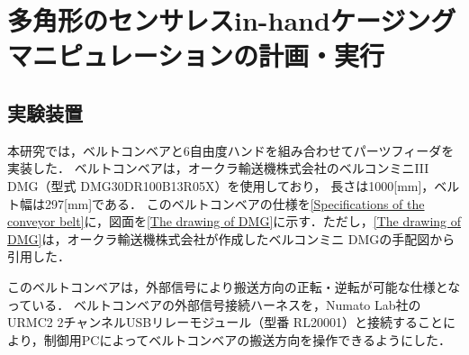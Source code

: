 \documentclass[a4paper,twoside,12pt,papersize, dvipdfmx]{iirthesis}
\begin{document}
    \newcommand{\figref}[1]{\figurename\ref{#1}}
    \newcommand{\tabref}[1]{\tablename\ref{#1}}
    \renewcommand{\eqref}[1]{式~(\ref{#1})}
    \newcommand{\chapref}[1]{\ref{#1}章}
    \newcommand{\secref}[1]{\ref{#1}節}
    \newcommand{\ssecref}[1]{\ref{#1}項}
    \newcommand{\appref}[1]{付録\ref{#1}}
\fi


\chapter{多角形のセンサレスin-handケージングマニピュレーションの計画・実行}\label{chap::result}
\minitoc

\section{実験装置 \cite{kamikukita2022}}\label{sec::result::development}
本研究では，ベルトコンベアと6自由度ハンドを組み合わせてパーツフィーダを実装した．
ベルトコンベアは，オークラ輸送機株式会社のベルコンミニI\hspace{-.1em}I\hspace{-.1em}I DMG（型式 DMG30DR100B13R05X）を使用しており，
長さは1000[mm]，ベルト幅は297[mm]である．
このベルトコンベアの仕様を\tabref{Specifications of the conveyor belt}に，図面を\figref{The drawing of DMG}に示す．ただし，\figref{The drawing of DMG}は，オークラ輸送機株式会社が作成したベルコンミニ DMGの手配図から引用した．

このベルトコンベアは，外部信号により搬送方向の正転・逆転が可能な仕様となっている．
ベルトコンベアの外部信号接続ハーネスを，Numato Lab社のURMC2 2チャンネルUSBリレーモジュール（型番 RL20001）と接続することにより，制御用PCによってベルトコンベアの搬送方向を操作できるようにした．
\end{document}
